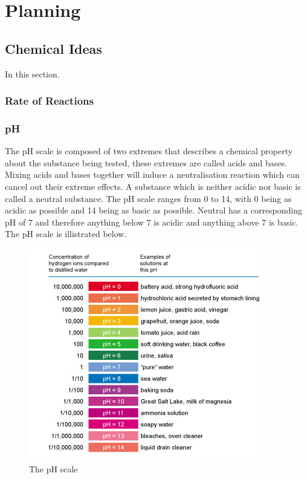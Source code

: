\chapter {Planning}

\section {Chemical Ideas}

In this section.

	\subsection{Rate of Reactions}




	\subsection{pH}

The pH scale is composed of two extremes that describes a chemical property about the substance being tested, these extremes are called acids and bases. Mixing acids and bases together will induce a neutralisation reaction which can cancel out their extreme effects. A substance which is neither acidic nor basic is called a neutral substance. The pH scale ranges from 0 to 14, with 0 being as acidic as possible and 14 being as basic as possible. Neutral has a corresponding pH of 7 and therefore anything below 7 is acidic and anything above 7 is basic. The pH scale is illistrated below.


\begin{figure}[H]
    \includegraphics[width=\textwidth]{./Planning/Images/pHScale.jpg}
    \caption{The pH scale} \label{fig:pH Scale}
\end{figure}

